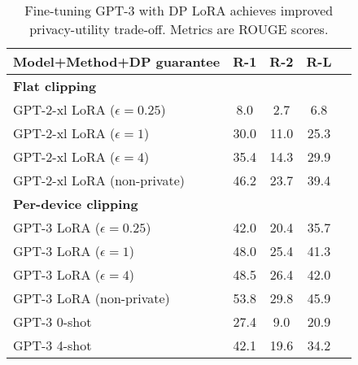\begin{wraptable}[14]{r}{6.3cm}
\footnotesize
\caption{Fine-tuning GPT-3 with DP LoRA achieves improved privacy-utility trade-off. Metrics are ROUGE scores.}
\vspace{-3mm}
\begin{tabular}{l c ccc}\\
\toprule
Model+Method+DP guarantee & R-1 & R-2 & R-L \\
\midrule
\textbf{Flat clipping} & & & \\
\hspace{1mm} GPT-2-xl LoRA ($\epsilon= 0.25$) & 8.0 & 2.7 & 6.8 \\
\hspace{1mm} GPT-2-xl LoRA ($\epsilon=1$)     & 30.0 & 11.0 & 25.3 \\
\hspace{1mm} GPT-2-xl LoRA ($\epsilon=4$)     & 35.4 & 14.3 & 29.9 \\
GPT-2-xl LoRA (non-private)     & 46.2 & 23.7 & 39.4 \\
\midrule
\textbf{Per-device clipping} & & & \\
\hspace{1mm} GPT-3 LoRA ($\epsilon= 0.25$) & 42.0 & 20.4 & 35.7 \\
\hspace{1mm} GPT-3 LoRA ($\epsilon= 1$)    & 48.0 & 25.4 & 41.3 \\
\hspace{1mm} GPT-3 LoRA ($\epsilon= 4$)    & 48.5 & 26.4 & 42.0 \\
GPT-3 LoRA (non-private) & 53.8 & 29.8 & 45.9 \\

\midrule
GPT-3 0-shot             & 27.4 & 9.0 & 20.9 \\
GPT-3 4-shot             & 42.1 & 19.6 & 34.2 \\

\bottomrule
\end{tabular}
\label{table:gpt3_trimmed}
\end{wraptable}
